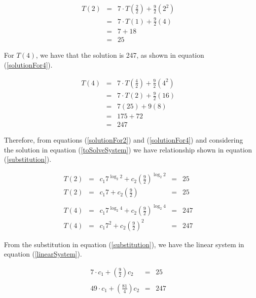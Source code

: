 \documentclass[tikz, 12pt]{scrartcl}
\begin{document}
\begin{eqnarray}
T(2)	&	=	&	7 \cdot T\left(\frac{2}{2}\right) + \frac{9}{2}\left(2^2 \right) \nonumber \\
	&	=	&	7 \cdot T(1) +  \frac{9}{2}\left(4 \right) \nonumber \\
	&	=	&	7  + 18 \nonumber \\
	&	=	&	25 \label{solutionFor2}
\end{eqnarray}

For $T(4)$, we have that the solution is 247, as shown in equation (\ref{solutionFor4}).

\begin{eqnarray}
T(4)	&	=	&	7 \cdot T\left(\frac{4}{2}\right) + \frac{9}{2}\left(4^2 \right) \nonumber \\
	&	=	&	7 \cdot T(2) +  \frac{9}{2}\left(16 \right) \nonumber \\
	&	=	&	7(25)  + 9(8) \nonumber \\
	&	=	&	175 + 72 \nonumber \\
	&	=	&	247 \label{solutionFor4}
\end{eqnarray}

Therefore, from equations (\ref{solutionFor2}) and (\ref{solutionFor4}) and considering the solution in equation (\ref{toSolveSystem}) we have relationship shown in equation (\ref{substitution}).

\begin{equation}\label{substitution}
	\begin{array}{ccccc}
	T(2)	&	=	&	c_1 7^{\log_2 2} + c_2 \left( \frac{9}{2} \right)^{\log_2 2}	&	 =	&	25\\
	T(2)	&	=	&	c_1 7 + c_2 \left( \frac{9}{2} \right)	&	 =	&	25 \\
	\\
	T(4)	&	=	&	c_1 7^{\log_2 4} + c_2 \left( \frac{9}{2} \right)^{\log_2 4}	&	 =	&	247\\
	T(4)	&	=	&	c_1 7^{2} + c_2 \left( \frac{9}{2} \right)^{2}	&	 =	&	247
	\end{array}
\end{equation}

From the substitution in equation (\ref{substitution}), we have the linear system in equation (\ref{linearSystem}).

\begin{equation}\label{linearSystem}
	\begin{array}{ccc}
	 7 \cdot c_1 +  \left( \frac{9}{2} \right)	c_2 &	 =	&	25 \\
	 \\
	49 \cdot c_1 + \left( \frac{81}{4} \right) c_2	&	 =	&	247
	\end{array}
\end{equation}
\end{document}
